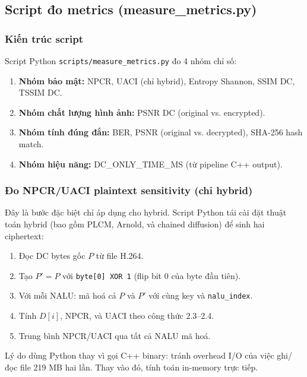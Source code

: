 \subsection{Script đo metrics (measure\_metrics.py)}

\subsubsection{Kiến trúc script}

Script Python \texttt{scripts/measure\_metrics.py} đo 4 nhóm chỉ số:

\begin{enumerate}
  \item \textbf{Nhóm bảo mật:} NPCR, UACI (chỉ hybrid), Entropy Shannon,
        SSIM DC, TSSIM DC.
  \item \textbf{Nhóm chất lượng hình ảnh:} PSNR DC (original vs. encrypted).
  \item \textbf{Nhóm tính đúng đắn:} BER, PSNR (original vs. decrypted),
        SHA-256 hash match.
  \item \textbf{Nhóm hiệu năng:} DC\_ONLY\_TIME\_MS (từ pipeline C++ output).
\end{enumerate}

\subsubsection{Đo NPCR/UACI plaintext sensitivity (chỉ hybrid)}

Đây là bước đặc biệt chỉ áp dụng cho hybrid. Script Python tái cài đặt thuật toán
hybrid (bao gồm PLCM, Arnold, và chained diffusion) để sinh hai ciphertext:

\begin{enumerate}
  \item Đọc DC bytes gốc $P$ từ file H.264.
  \item Tạo $P' = P$ với \texttt{byte[0] XOR 1} (flip bit 0 của byte đầu tiên).
  \item Với mỗi NALU: mã hoá cả $P$ và $P'$ với cùng key và \texttt{nalu\_index}.
  \item Tính $D[i]$, $\text{NPCR}$, và $\text{UACI}$ theo công thức 2.3--2.4.
  \item Trung bình NPCR/UACI qua tất cả NALU mã hoá.
\end{enumerate}

Lý do dùng Python thay vì gọi C++ binary: tránh overhead I/O của việc ghi/đọc
file 219 MB hai lần. Thay vào đó, tính toán in-memory trực tiếp.

